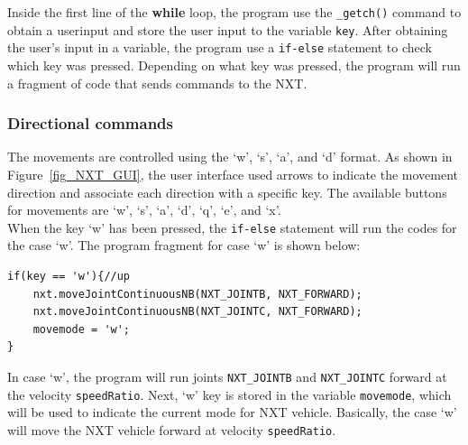 \documentclass[11pt]{article}
\begin{document}
Inside the first line of the {\bf while} loop, the program use the {\tt \_getch()} 
command to obtain a userinput and store the user input to the variable {\tt key}. 
After obtaining the user's input in a variable, the program use a {\tt if-else} 
statement to check which key was pressed. Depending on what key was pressed, the 
program will run a fragment of code that sends commands to the NXT.

\subsubsection*{Directional commands}
The movements are controlled using the `w', `s', `a', and `d' format. As shown 
in Figure~\ref{fig_NXT_GUI}, the user interface used arrows to indicate the 
movement direction and associate each direction with a specific key. The 
available buttons for movements are `w', `s', `a', `d', `q', `e', and `x'.\\
When the key `w' has been pressed, the {\tt if-else} statement will run 
the codes for the case `w'. The program fragment for case `w' is shown below:
\begin{lstlisting}
if(key == 'w'){//up
    nxt.moveJointContinuousNB(NXT_JOINTB, NXT_FORWARD);
    nxt.moveJointContinuousNB(NXT_JOINTC, NXT_FORWARD);
    movemode = 'w';
}
\end{lstlisting}
In case `w', the program will run joints {\tt NXT\_JOINTB} and {\tt NXT\_JOINTC} 
forward at the velocity {\tt speedRatio}. Next, `w' key is stored in the variable 
{\tt movemode}, which will be used to indicate the current mode for NXT vehicle. 
Basically, the case `w' will move the NXT vehicle forward at velocity {\tt speedRatio}.\\
\end{document}
